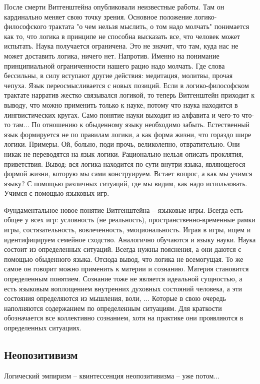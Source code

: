 \documentclass[a4paper, 12pt]{article}
\begin{document}
После смерти Витгенштейна опубликовали неизвестные работы. Там он 
кардинально меняет свою точку зрения. Основное положение 
логико-философского трактата "о чем нельзя мыслить, о том надо молчать" 
понимается как то, что логика в принципе не способна высказать все, что 
человек может испытать. Наука получается ограничена. Это не значит, что 
там, куда нас не может доставить логика, ничего нет. Напротив. Именно на 
понимание принципиальной ограниченности нашего рацио надо молчать. Где 
слова бессильны, в силу вступают другие действия: медитация, молитвы, 
прочая чепуха. Язык переосмысливается с новых позиций. Если 
в логико-философском трактате нарратив жестко связывался логикой, то 
теперь Витгенштейн приходит к выводу, что можно применить только 
к науке, потому что наука находится в лингвистических кругах. Само 
понятие науки выходит из алфавита и чего-то что-то там... По отношению 
к обыденному языку необходимо забыть. Естественный язык формируется не 
по правилам логики, а как форма жизни, что гораздо шире логики. Примеры. 
Ой, больно, поди прочь, великолепно, отвратительно. Они никак не 
переводятся на язык логики. Рационально нельзя описать проклятия, 
приветствия. Вывод: вся логика находится по сути внутри языка, 
являющегося формой жизни, которую мы сами конструируем. Встает вопрос, 
а как мы учимся языку? С помощью различных ситуаций, где мы видим, как 
надо использовать. Учимся с помощью языковых игр.

Фундаментальное новое понятие Витгенштейна -- языковые игры. Всегда есть 
общее у всех игр: условность (не реальность), пространственно-временные 
рамки игры, состязательность, вовлеченность, эмоциональность. Играя 
в игры, ищем и идентифицируем семейное сходство. Аналогично обучаются 
и языку науки. Наука состоит из определенных ситуаций. Всегда нужны 
пояснения, а они даются с помощью обыденного языка. Отсюда вывод, что 
логика не всемогущая. То же самое он говорит можно применить к материи 
и сознанию. Материя становится определенным понятием. Сознание тоже не 
является идеальной сущностью, а есть языковым воплощением внутренних 
духовных состояний человека, а эти состояния определяются из мышления, 
воли, ... Которые в свою очередь наполняются содержанием по определенным 
ситуациям. Для краткости обозначается все коллективно сознанием, хотя на 
практике они проявляются в определенных ситуациях.


\subsection{Неопозитивизм}

Логический эмпиризм -- квинтессенция неопозитивизма -- уже потом...


\end{document}
